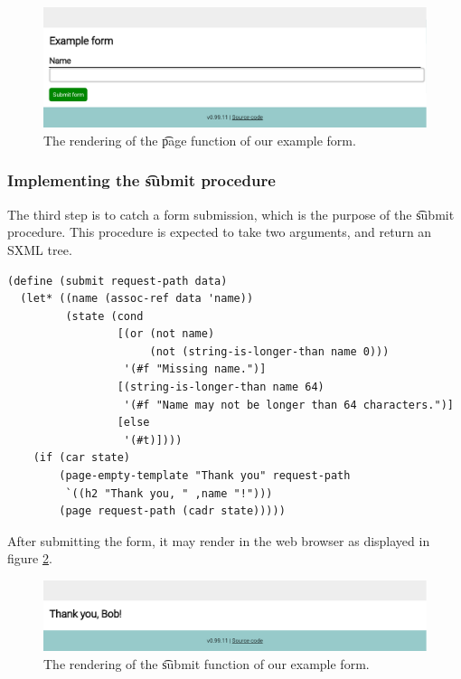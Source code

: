   \begin{figure}[H]
    \begin{center}
      \includegraphics[width=1.0\textwidth]{figures/sg-web-form-example.pdf}
    \end{center}
    \caption{The rendering of the \t{page} function of our example form.}
    \label{fig:web-form-example}
  \end{figure}

\subsubsection{Implementing the \t{submit} procedure}

  The third step is to catch a form submission, which is the purpose of the
  \t{submit} procedure.  This procedure is expected to take two arguments,
  and return an SXML tree.

\begin{siderules}
\begin{verbatim}
(define (submit request-path data)
  (let* ((name (assoc-ref data 'name))
         (state (cond
                 [(or (not name)
                      (not (string-is-longer-than name 0)))
                  '(#f "Missing name.")]
                 [(string-is-longer-than name 64)
                  '(#f "Name may not be longer than 64 characters.")]
                 [else
                  '(#t)])))
    (if (car state)
        (page-empty-template "Thank you" request-path
         `((h2 "Thank you, " ,name "!")))
        (page request-path (cadr state)))))
\end{verbatim}
\end{siderules}

  After submitting the form, it may render in the web browser as displayed
  in figure \ref{fig:web-form-submit}.

  \begin{figure}[H]
    \begin{center}
      \includegraphics[width=1.0\textwidth]{figures/sg-web-form-example-submit.pdf}
    \end{center}
    \caption{The rendering of the \t{submit} function of our example form.}
    \label{fig:web-form-submit}
  \end{figure}


